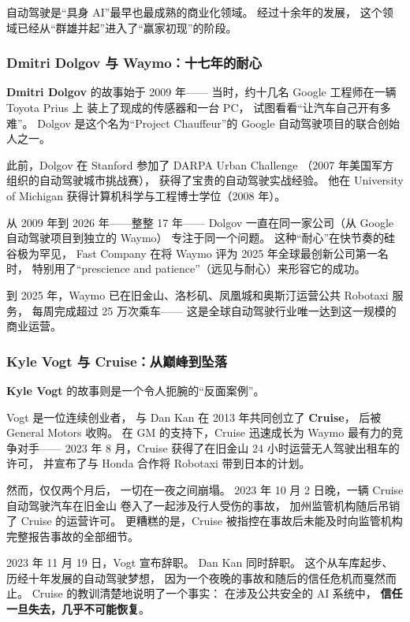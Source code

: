 自动驾驶是``具身 AI''最早也最成熟的商业化领域。
经过十余年的发展，
这个领域已经从``群雄并起''进入了``赢家初现''的阶段。

\subsubsection{Dmitri Dolgov 与 Waymo：十七年的耐心}

\textbf{Dmitri Dolgov} 的故事始于 2009 年——
当时，约十几名 Google 工程师在一辆 Toyota Prius 上
装上了现成的传感器和一台 PC，
试图看看``让汽车自己开有多难''。
Dolgov 是这个名为``Project Chauffeur''的 Google 自动驾驶项目的联合创始人之一。

此前，Dolgov 在 Stanford 参加了 DARPA Urban Challenge
（2007 年美国军方组织的自动驾驶城市挑战赛），
获得了宝贵的自动驾驶实战经验。
他在 University of Michigan 获得计算机科学与工程博士学位（2008 年）。

从 2009 年到 2026 年——整整 17 年——
Dolgov 一直在同一家公司（从 Google 自动驾驶项目到独立的 Waymo）
专注于同一个问题。
这种``耐心''在快节奏的硅谷极为罕见，
Fast Company 在将 Waymo 评为 2025 年全球最创新公司第一名时，
特别用了``prescience and patience''（远见与耐心）来形容它的成功。

到 2025 年，Waymo 已在旧金山、洛杉矶、凤凰城和奥斯汀运营公共 Robotaxi 服务，
每周完成超过 25 万次乘车——
这是全球自动驾驶行业唯一达到这一规模的商业运营。

\subsubsection{Kyle Vogt 与 Cruise：从巅峰到坠落}

\textbf{Kyle Vogt} 的故事则是一个令人扼腕的``反面案例''。

Vogt 是一位连续创业者，
与 Dan Kan 在 2013 年共同创立了 \textbf{Cruise}，
后被 General Motors 收购。
在 GM 的支持下，Cruise 迅速成长为 Waymo 最有力的竞争对手——
2023 年 8 月，Cruise 获得了在旧金山 24 小时运营无人驾驶出租车的许可，
并宣布了与 Honda 合作将 Robotaxi 带到日本的计划。

然而，仅仅两个月后，
一切在一夜之间崩塌。
2023 年 10 月 2 日晚，一辆 Cruise 自动驾驶汽车在旧金山
卷入了一起涉及行人受伤的事故，
加州监管机构随后吊销了 Cruise 的运营许可。
更糟糕的是，Cruise 被指控在事故后未能及时向监管机构
完整报告事故的全部细节。

2023 年 11 月 19 日，Vogt 宣布辞职。
Dan Kan 同时辞职。
这个从车库起步、历经十年发展的自动驾驶梦想，
因为一个夜晚的事故和随后的信任危机而戛然而止。
Cruise 的教训清楚地说明了一个事实：
在涉及公共安全的 AI 系统中，
\textbf{信任一旦失去，几乎不可能恢复}。

